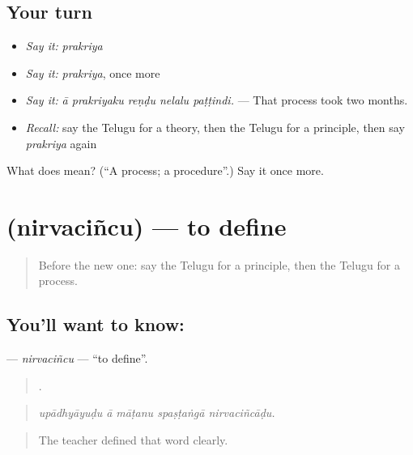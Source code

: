 \subsection*{Your turn}
\begin{itemize}
\raggedright
  \item \emph{Say it:} \emph{prakriya}
  \item \emph{Say it:} \emph{prakriya}, once more
  \item \emph{Say it:} \emph{ā prakriyaku reṇḍu nelalu paṭṭindi.} — That process took two months.
  \item \emph{Recall:} say the Telugu for a theory, then the Telugu for a principle, then say \emph{prakriya} again
\end{itemize}

\begin{tcolorbox}[breakable,colback=teal!4,colframe=teal!35!black,title={Before you move on}]
What does  mean? (\textquotedblleft{}A process; a procedure\textquotedblright{}.) Say it once more.
\end{tcolorbox}
\section[\texorpdfstring{\te{నిర్వచించు} (nirvaciñcu)}{నిర్వచించు (nirvaciñcu)}]{ (nirvaciñcu) — to define}

\label{lesson:TE-C390-nirvacincu}



\begin{quote}
Before the new one: say the Telugu for a principle, then the Telugu for a process.
\end{quote}

\subsection*{You'll want to know: }
\textbf{} — \emph{nirvaciñcu} — \textquotedblleft{}to define\textquotedblright{}.

\begin{quote}
    .
\end{quote}

\begin{quote}
\emph{upādhyāyuḍu ā māṭanu spaṣṭaṅgā nirvaciñcāḍu.}
\end{quote}

\begin{quote}
The teacher defined that word clearly.
\end{quote}

